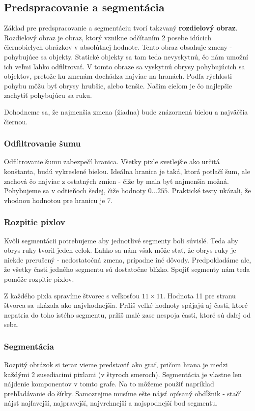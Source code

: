 \subsection{Predspracovanie a segmentácia}\label{chap:preprocess}

Základ pre predspracovanie a segmentáciu tvorí takzvaný \textbf{rozdielový obraz}. Rozdielový obraz je obraz, ktorý vznikne odčítaním 2 posebe idúcich čiernobielych obrázkov v absolútnej hodnote. Tento obraz obsahuje zmeny - pohybujúce sa objekty. Statické objekty sa tam teda nevyskytnú, čo nám umožní ich veľmi ľahko odfiltrovať. V tomto obraze sa vyskytnú obrysy pohybujúcich sa objektov, pretože ku zmenám dochádza najviac na hranách. Podľa rýchlosti pohybu môžu byť obrysy hrubšie, alebo tenšie. 
Našim cieľom je čo najlepšie zachytiť pohybujúcu sa ruku.

Dohodneme sa, že najmenšia zmena (žiadna) bude znázornená bielou a najväčšia čiernou. 

\subsubsection{Odfiltrovanie šumu}
Odfiltrovanie šumu zabezpečí hranica. Všetky pixle svetlejšie ako určitá konštanta, budú vykreslené bielou. Ideálna hranica je taká, ktorá potlačí šum, ale zachová čo najviac z ostatných zmien - čiže by mala byť najmenšia možná. Pohybujeme sa v odtieňoch šedej, čiže hodnoty $0\dots 255$. Praktické testy ukázali, že vhodnou hodnotou pre hranicu je 7.

\subsubsection{Rozpitie pixlov}

Kvôli segmentácii potrebujeme aby jednotlivé segmenty boli súvislé. Teda aby obrys ruky tvoril jeden celok.
Ľahko sa nám však môže stať, že obrys ruky je niekde prerušený - nedostatočná zmena, prípadne iné dôvody. Predpokladáme ale, že všetky časti jedného segmentu sú dostatočne blízko. Spojiť segmenty nám teda pomôže rozpitie pixlov. 

Z každého pixla spravíme štvorec s veľkosťou $11\times 11$.
Hodnota 11 pre stranu štvorca sa ukázala ako najvhodnejšia. 
Príliš veľké hodnoty spájajú aj časti, ktoré nepatria do toho istého segmentu, príliš malé zase nespoja časti, ktoré sú ďalej od seba.

\subsubsection{Segmentácia}\label{subsubsect:segment}
Rozpitý obrázok si teraz vieme predstaviť ako graf, pričom hrana je medzi každými 2 susediacimi pixlami (v štyroch smeroch). Segmentácia je vlastne len nájdenie komponentov v tomto grafe. Na to môžeme použiť napríklad prehľadávanie do šírky. Samozrejme musíme ešte nájsť opísaný obdĺžnik - stačí nájsť najľavejší, najpravejší, najvrchnejší a najspodnejší bod segmentu.

